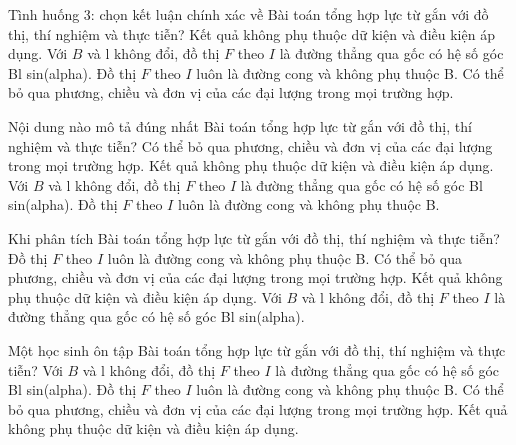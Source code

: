 \begin{ex}
Tình huống 3: chọn kết luận chính xác về Bài toán tổng hợp lực từ gắn với đồ thị, thí nghiệm và thực tiễn?
\choice
{Kết quả không phụ thuộc dữ kiện và điều kiện áp dụng.}
{\True Với $B$ và l không đổi, đồ thị $F$ theo $I$ là đường thẳng qua gốc có hệ số góc Bl sin(alpha).}
{Đồ thị $F$ theo $I$ luôn là đường cong và không phụ thuộc B.}
{Có thể bỏ qua phương, chiều và đơn vị của các đại lượng trong mọi trường hợp.}
\end{ex}

\begin{ex}
Nội dung nào mô tả đúng nhất Bài toán tổng hợp lực từ gắn với đồ thị, thí nghiệm và thực tiễn?
\choice
{Có thể bỏ qua phương, chiều và đơn vị của các đại lượng trong mọi trường hợp.}
{Kết quả không phụ thuộc dữ kiện và điều kiện áp dụng.}
{\True Với $B$ và l không đổi, đồ thị $F$ theo $I$ là đường thẳng qua gốc có hệ số góc Bl sin(alpha).}
{Đồ thị $F$ theo $I$ luôn là đường cong và không phụ thuộc B.}
\end{ex}

\begin{ex}
Khi phân tích Bài toán tổng hợp lực từ gắn với đồ thị, thí nghiệm và thực tiễn?
\choice
{Đồ thị $F$ theo $I$ luôn là đường cong và không phụ thuộc B.}
{Có thể bỏ qua phương, chiều và đơn vị của các đại lượng trong mọi trường hợp.}
{Kết quả không phụ thuộc dữ kiện và điều kiện áp dụng.}
{\True Với $B$ và l không đổi, đồ thị $F$ theo $I$ là đường thẳng qua gốc có hệ số góc Bl sin(alpha).}
\end{ex}

\begin{ex}
Một học sinh ôn tập Bài toán tổng hợp lực từ gắn với đồ thị, thí nghiệm và thực tiễn?
\choice
{\True Với $B$ và l không đổi, đồ thị $F$ theo $I$ là đường thẳng qua gốc có hệ số góc Bl sin(alpha).}
{Đồ thị $F$ theo $I$ luôn là đường cong và không phụ thuộc B.}
{Có thể bỏ qua phương, chiều và đơn vị của các đại lượng trong mọi trường hợp.}
{Kết quả không phụ thuộc dữ kiện và điều kiện áp dụng.}
\end{ex}

